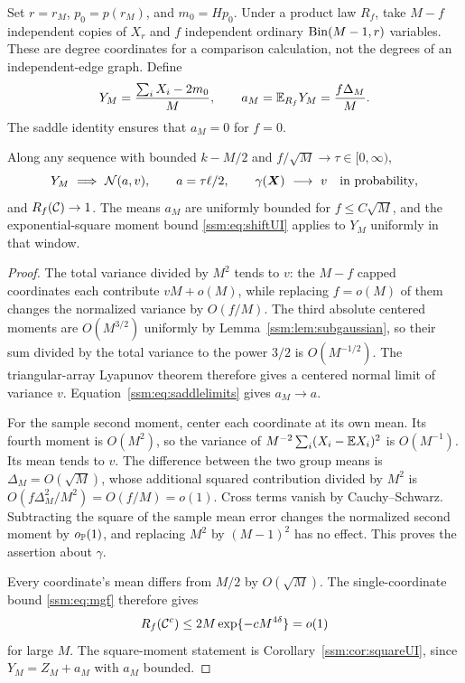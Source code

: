 Set $r=r_M$, $p_0=p(r_M)$, and $m_0=Hp_0$. Under a product law $R_f$, take $M-f$ independent copies of $X_r$ and $f$ independent ordinary $\operatorname{Bin}(M-1,r)$ variables. These are degree coordinates for a comparison calculation, not the degrees of an independent-edge graph. Define
\begin{equation}\label{ssm:eq:Yandshift}
 Y_M=\frac{\sum_iX_i-2m_0}{M},\qquad
 a_M=\mathbb E_{R_f}Y_M=\frac{f\Delta_M}{M}.
\end{equation}
The saddle identity ensures that $a_M=0$ for $f=0$.

\begin{lemma}\label{ssm:lem:productlimits}
Along any sequence with bounded $k-M/2$ and $f/\sqrt M\to\tau\in[0,\infty)$,
\begin{equation}\label{ssm:eq:productlimits}
 Y_M\ \Longrightarrow\ \mathcal N(a,v),\qquad
 a=\tau\ell/2,\qquad
 \gamma(\boldsymbol X)\ \longrightarrow\ v\quad\text{in probability},
\end{equation}
and $R_f(\mathcal C)\to1$. The means $a_M$ are uniformly bounded for $f\le C\sqrt M$, and the exponential-square moment bound \eqref{ssm:eq:shiftUI} applies to $Y_M$ uniformly in that window.
\end{lemma}
\begin{proof}
The total variance divided by $M^2$ tends to $v$: the $M-f$ capped coordinates each contribute $vM+o(M)$, while replacing $f=o(M)$ of them changes the normalized variance by $O(f/M)$. The third absolute centered moments are $O(M^{3/2})$ uniformly by Lemma~\ref{ssm:lem:subgaussian}, so their sum divided by the total variance to the power $3/2$ is $O(M^{-1/2})$. The triangular-array Lyapunov theorem therefore gives a centered normal limit of variance $v$. Equation~\eqref{ssm:eq:saddlelimits} gives $a_M\to a$.

For the sample second moment, center each coordinate at its own mean. Its fourth moment is $O(M^2)$, so the variance of $M^{-2}\sum_i(X_i-\mathbb E X_i)^2$ is $O(M^{-1})$. Its mean tends to $v$. The difference between the two group means is $\Delta_M=O(\sqrt M)$, whose additional squared contribution divided by $M^2$ is $O(f\Delta_M^2/M^2)=O(f/M)=o(1)$. Cross terms vanish by Cauchy--Schwarz. Subtracting the square of the sample mean error changes the normalized second moment by $o_{\mathbb P}(1)$, and replacing $M^2$ by $(M-1)^2$ has no effect. This proves the assertion about $\gamma$.

Every coordinate's mean differs from $M/2$ by $O(\sqrt M)$. The single-coordinate bound \eqref{ssm:eq:mgf} therefore gives
\[
 R_f(\mathcal C^c)\le2M\exp\{-cM^{4\delta}\}=o(1)
\]
for large $M$. The square-moment statement is Corollary~\ref{ssm:cor:squareUI}, since $Y_M=Z_M+a_M$ with $a_M$ bounded.
\end{proof}
